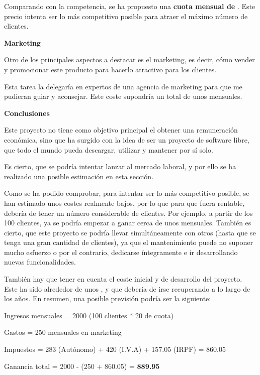 Comparando con la competencia, se ha propuesto una \textbf{cuota mensual de \text{20\euro}}. Este precio intenta ser lo más competitivo posible para atraer el máximo número de clientes.

\newpage

\textbf{Marketing}

Otro de los principales aspectos a destacar es el marketing, es decir, cómo vender y promocionar este producto para hacerlo atractivo para los clientes. 

Esta tarea la delegaría en expertos de una agencia de marketing para que me pudieran guiar y aconsejar. Este coste supondría un total de unos \text{250\euro} mensuales.

\textbf{Conclusiones}

Este proyecto no tiene como objetivo principal el obtener una remuneración económica, sino que ha surgido con la idea de ser un proyecto de software libre, que todo el mundo pueda descargar, utilizar y mantener por sí solo.

Es cierto, que se podría intentar lanzar al mercado laboral, y por ello se ha realizado una posible estimación en esta sección.

Como se ha podido comprobar, para intentar ser lo más competitivo posible, se han estimado unos costes realmente bajos, por lo que para que fuera rentable, debería de tener un número considerable de clientes. Por ejemplo, a partir de los 100 clientes, ya se podría empezar a ganar cerca de unos \text{1000\euro} mensuales. También es cierto, que este proyecto se podría llevar simultáneamente con otros (hasta que se tenga una gran cantidad de clientes), ya que el mantenimiento puede no suponer mucho esfuerzo o por el contrario, dedicarse íntegramente e ir desarrollando nuevas funcionalidades.

También hay que tener en cuenta el coste inicial y de desarrollo del proyecto. Este ha sido alrededor de unos \text{10000\euro}, y que debería de irse recuperando a lo largo de los años. En resumen, una posible previsión podría ser la siguiente:

Ingresos mensuales = 2000\text{\euro} (100 clientes * 20\text{\euro} de cuota)

Gastos = 250\text{\euro} mensuales en marketing

Impuestos = 283\text{\euro} (Autónomo) + 420\text{\euro} (I.V.A) + 157.05\text{\euro} (IRPF) = 860.05\text{\euro}

Ganancia total = 2000\text{\euro} - (250\text{\euro} + 860.05\text{\euro}) = \textbf{889.95 \text{\euro}}

\newpage